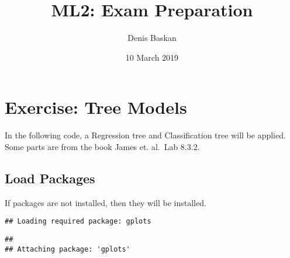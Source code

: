 \documentclass[]{article}
\title{ML2: Exam Preparation}
\author{Denis Baskan}
\date{10 March 2019}
\newenvironment{Shaded}{\begin{snugshade}}{\end{snugshade}}
\newcommand{\ControlFlowTok}[1]{\textcolor[rgb]{0.13,0.29,0.53}{\textbf{#1}}}
\newcommand{\DataTypeTok}[1]{\textcolor[rgb]{0.13,0.29,0.53}{#1}}
\newcommand{\KeywordTok}[1]{\textcolor[rgb]{0.13,0.29,0.53}{\textbf{#1}}}
\newcommand{\NormalTok}[1]{#1}
\newcommand{\OperatorTok}[1]{\textcolor[rgb]{0.81,0.36,0.00}{\textbf{#1}}}
\newcommand{\OtherTok}[1]{\textcolor[rgb]{0.56,0.35,0.01}{#1}}
\newcommand{\StringTok}[1]{\textcolor[rgb]{0.31,0.60,0.02}{#1}}
\begin{document}
\maketitle

\hypertarget{exercise-tree-models}{%
\section{Exercise: Tree Models}\label{exercise-tree-models}}

In the following code, a Regression tree and Classification tree will be
applied. Some parts are from the book James et. al.~Lab 8.3.2.

\hypertarget{load-packages}{%
\subsection{Load Packages}\label{load-packages}}

If packages are not installed, then they will be installed.

\begin{Shaded}
\end{Shaded}

\begin{verbatim}
## Loading required package: gplots
\end{verbatim}

\begin{verbatim}
## 
## Attaching package: 'gplots'
\end{verbatim}
\end{document}
